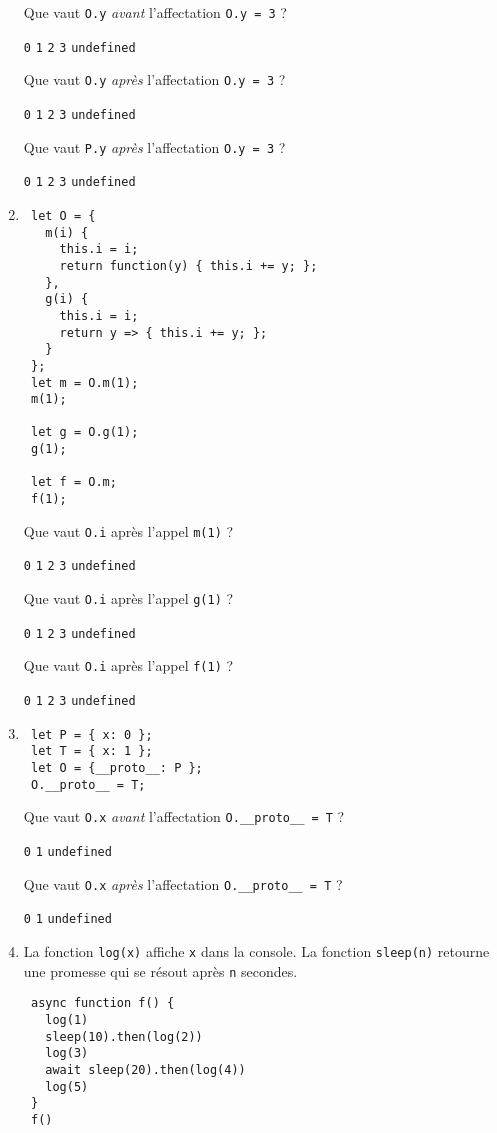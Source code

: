 \documentclass[a4paper, 12pt]{article}
\newcommand{\choicec}[1]{\Square\hspace{2pt} \lstinline{#1}\hspace{5pt}}
\newcommand{\fullpoint}[1]{\textcolor{RubineRed}{#1}}
\newcommand{\choicecg}[1]{\fullpoint{\XBox\hspace{2pt} \lstinline{#1}\hspace{5pt}}}
\begin{document}
\begin{enumerate}
  Que vaut \lstinline{O.y} \emph{avant} l'affectation \lstinline{O.y = 3} ?

  \choicec{0} \choicecg{1} \choicec{2} \choicec{3} \choicec{undefined}

  Que vaut \lstinline{O.y} \emph{après} l'affectation \lstinline{O.y = 3} ?

  \choicec{0} \choicec{1} \choicec{2} \choicecg{3} \choicec{undefined}

  Que vaut \lstinline{P.y} \emph{après} l'affectation \lstinline{O.y = 3} ?

  \choicec{0} \choicecg{1} \choicec{2} \choicec{3} \choicec{undefined}
\item \begin{lstlisting}
 let O = {
   m(i) {
     this.i = i;
     return function(y) { this.i += y; };
   },
   g(i) {
     this.i = i;
     return y => { this.i += y; };
   }
 };
 let m = O.m(1);
 m(1);

 let g = O.g(1);
 g(1);

 let f = O.m;
 f(1);
\end{lstlisting}

  Que vaut \lstinline{O.i} après l'appel \lstinline{m(1)} ?

  \choicec{0} \choicecg{1} \choicec{2} \choicec{3} \choicec{undefined}

  Que vaut \lstinline{O.i} après l'appel \lstinline{g(1)} ?

  \choicec{0} \choicec{1} \choicecg{2} \choicec{3} \choicec{undefined}

  Que vaut \lstinline{O.i} après l'appel \lstinline{f(1)} ?

  \choicec{0} \choicec{1} \choicecg{2} \choicec{3} \choicec{undefined}
\item \begin{lstlisting}
 let P = { x: 0 };
 let T = { x: 1 };
 let O = {__proto__: P };
 O.__proto__ = T;
\end{lstlisting}

  Que vaut \lstinline{O.x} \emph{avant} l'affectation \lstinline{O.__proto__ = T} ?

  \choicecg{0} \choicec{1} \choicec{undefined}

  Que vaut \lstinline{O.x} \emph{après} l'affectation \lstinline{O.__proto__ = T} ?

  \choicec{0} \choicecg{1} \choicec{undefined}
\item La fonction \lstinline{log(x)} affiche \lstinline{x} dans la console.  La
  fonction \lstinline{sleep(n)} retourne une promesse qui se résout après
  \lstinline{n} secondes.
  \begin{lstlisting}
 async function f() {
   log(1)
   sleep(10).then(log(2))
   log(3)
   await sleep(20).then(log(4))
   log(5)
 }
 f()
\end{lstlisting}


\end{enumerate}
\end{document}
